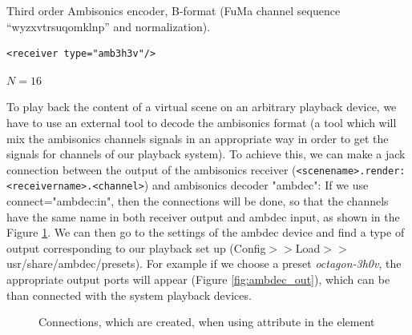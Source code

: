 Third order Ambisonics encoder, B-format (FuMa channel
sequence ``wyzxvtrsuqomklnp'' and normalization).

\begin{lstlisting}[numbers=none]
<receiver type="amb3h3v"/>
\end{lstlisting}

$N=16$

To play back the content of a virtual scene on an arbitrary playback
device, we have to use an external tool to decode the ambisonics
format (a tool which will mix the ambisonics channels signals in an
appropriate way in order to get the signals for channels of our
playback system).  To achieve this, we can make a jack connection
between the output of the ambisonics receiver
(\verb!<scenename>.render:<receivername>.<channel>!) and ambisonics
decoder "ambdec":
%
%
If we use connect="ambdec:in", then the connections will be done, so
that the channels have the same name in both receiver output and
ambdec input, as shown in the Figure \ref{fig:ambdec}. 
%
We can then go to the settings of the ambdec device and find a type of
output corresponding to our playback set up
(Config$>>$Load$>>$usr/share/ambdec/presets). 
%
For example if we choose a preset \textit{octagon-3h0v}, the
appropriate output ports will appear (Figure \ref{fig:ambdec_out}),
which can be than connected with the system playback devices.

\begin{figure}[htb]
  \centering
  \caption{Connections, which are created, when using attribute  in the element }
  \label{fig:ambdec}
\end{figure}
 
